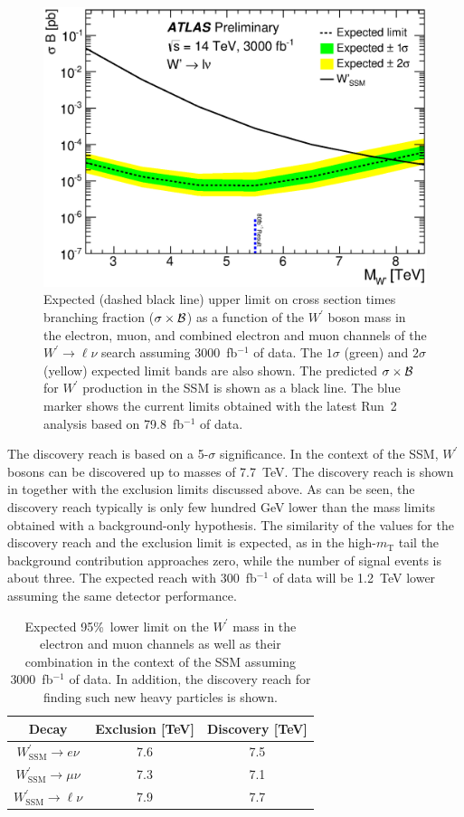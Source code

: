 \begin{figure}[tpb]
\centering
 \includegraphics[width=0.48\columnwidth]{./section7OtherSignatures/img/Limit_xsec_wprime_comb_Sys_3000ifb_14TeV.eps}
  \caption{
    Expected (dashed black line) upper limit on cross section times branching fraction ($\sigma\times\cal{B}$)
    as a function of the $W^\prime$ boson mass in the electron, muon, and combined electron and muon channels
    of the $W^\prime \to \ell \nu$ search assuming 3000~fb$^{-1}$ of data. The $1\sigma$ (green) and $2\sigma$
    (yellow) expected limit bands are also shown.
    The predicted $\sigma\times\cal{B}$ for $W^\prime$ production in the SSM is shown as a black line.
    The blue marker shows the current limits obtained with the latest Run~2 analysis based on 79.8~fb$^{-1}$
    of data.
}
  \label{fig:ATLAS_wplnulimits}
\end{figure}
%

The discovery reach is based on a 5-$\sigma$ significance. In the context of the SSM, $W^\prime$ bosons
can be discovered up to masses of 7.7~TeV. The discovery reach is shown in 
together with the exclusion limits discussed above.
As can be seen, the discovery reach typically is only few hundred GeV lower than the mass limits obtained
with a background-only hypothesis.
The similarity of the values for the discovery reach and the exclusion limit is expected,
as in the high-$m_\mathrm{T}$ tail the background contribution approaches zero,
while the number of signal events is about three.
The expected reach with 300~fb$^{-1}$ of data will be 1.2~TeV lower assuming the same detector performance. 
\begin{table}[tbp]
  \caption{Expected 95\%~\cl lower limit on the $W^\prime$ mass in the electron and muon channels
    as well as their combination in the context of the SSM assuming 3000~fb$^{-1}$ of data.
    In addition, the discovery reach for finding such new heavy particles is shown.}
  \centering
  \begin{tabular}{c|cc}
    \hline
    \hline
    Decay     &  Exclusion [TeV]& Discovery [TeV]\\
    \hline
    $W^\prime_\mathrm{SSM} \to e\nu$   & 7.6 & 7.5\\
    $W^\prime_\mathrm{SSM} \to \mu\nu$ & 7.3 & 7.1\\ \hline
    $W^\prime_\mathrm{SSM} \to \ell\nu$  & 7.9 & 7.7\\
    \hline
    \hline
  \end{tabular}
  \label{tab:ATLAS_wplnulimits}
\end{table}




